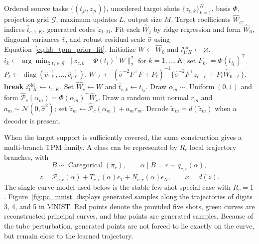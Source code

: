 \documentclass[preprint,12pt,number]{elsarticle}
\begin{document}
\begin{algorithm}[H]
\caption{HB-TPM source fitting, target adaptation, and benchmark sampling}
\label{alg:hb_tpm}
\begin{algorithmic}[1]
\REQUIRE Ordered source tasks $\{(t_{ji},z_{ji})\}$, unordered target shots $\{z_{c,k}\}_{k=1}^{K}$, basis $\Phi$, projection grid $\mathcal G$, maximum updates $L$, output size $M$.
\ENSURE Target coefficients $\widehat W_c$, indices $\widehat t_{c,1:K}$, generated codes $\tilde z_{1:M}$.
\STATE Fit each $\widehat W_j$ by ridge regression and form $\widehat W_0$, diagonal variances $\widehat v$, and robust residual scale $\widehat\sigma$ using Equation~\ref{eq:hb_tpm_prior_fit}.
\STATE Initialize $W\leftarrow\widehat W_0$ and $i_{1:K}^{\mathrm{old}}\leftarrow\varnothing$.
    \STATE $i_k\leftarrow\arg\min_{i:\,t_i\in\mathcal G}\lVert z_{c,k}-\Phi(t_i)^\top W\rVert_2^2$ for $k=1,\ldots,K$; set $F_{k\cdot}=\Phi(t_{i_k})^\top$.
        \STATE $P_\ell\leftarrow\operatorname{diag}(\widehat v_{1\ell}^{-1},\ldots,\widehat v_{p\ell}^{-1})$.
        \STATE $W_{\cdot\ell}\leftarrow(\widehat\sigma^{-2}F^\top F+P_\ell)^{-1}\{\widehat\sigma^{-2}F^\top z_{c,\cdot\ell}+P_\ell\widehat W_{0,\cdot\ell}\}$.
    \ENDFOR
        \STATE \textbf{break}
    \ENDIF
    \STATE $i_{1:K}^{\mathrm{old}}\leftarrow i_{1:K}$.
\ENDFOR
\STATE Set $\widehat W_c\leftarrow W$ and $\widehat t_{c,k}\leftarrow t_{i_k}$.
    \STATE Draw $\alpha_m\sim\operatorname{Uniform}(0,1)$ and form $\widehat{\mathcal P}_c(\alpha_m)=\Phi(\alpha_m)^\top\widehat W_c$.
    \STATE Draw a random unit normal $r_m$ and $a_m\sim\mathcal N(0,\widehat\sigma^2)$; set $\tilde z_m\leftarrow\widehat{\mathcal P}_c(\alpha_m)+a_m r_m$.
\ENDFOR
\STATE Decode $\tilde x_m=d(\tilde z_m)$ when a decoder is present.
\end{algorithmic}
\end{algorithm}

When the target support is sufficiently covered, the same construction gives a multi-branch TPM family. A class can be represented by $R_c$ local trajectory branches, with
\[
	B\sim \operatorname{Categorical}(\pi_c),
	\qquad
	\alpha\mid B=r\sim q_{c,r}(\alpha),
\]
\[
	\tilde z
	=
	\widehat{\mathcal{P}}_{c,r}(\alpha)
	+
	T_{c,r}(\alpha)\epsilon_T
	+
	N_{c,r}(\alpha)\epsilon_N,
	\qquad
	\tilde x=d(\tilde z).
\]
The single-curve model used below is the stable few-shot special case with $R_c=1$. Figure~\ref{fig:pc_mnist} displays generated samples along the trajectories of digits 3, 4, and 5 in MNIST. Red points denote the provided five shots, green curves are reconstructed principal curves, and blue points are generated samples. Because of the tube perturbation, generated points are not forced to lie exactly on the curve, but remain close to the learned trajectory.
\end{document}
